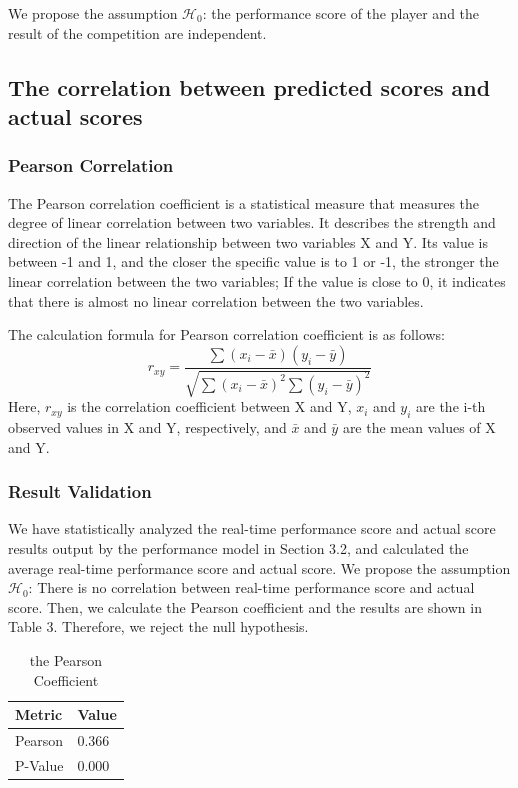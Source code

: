 \documentclass{mcmthesis}
\begin{document}
We propose the assumption $\mathcal{H}_0$: the performance score of the player and the result of the competition are independent.

\subsection{The correlation between predicted scores and actual scores}
\subsubsection{Pearson Correlation}
The Pearson correlation coefficient is a statistical measure that measures the degree of linear correlation between two variables. It describes the strength and direction of the linear relationship between two variables X and Y. Its value is between -1 and 1, and the closer the specific value is to 1 or -1, the stronger the linear correlation between the two variables; If the value is close to 0, it indicates that there is almost no linear correlation between the two variables.

The calculation formula for Pearson correlation coefficient is as follows:\[
	r_{x y}=\frac{\sum\left(x_{i}-\bar{x}\right)\left(y_{i}-\bar{y}\right)}{\sqrt{\sum\left(x_{i}-\bar{x}\right)^{2} \sum\left(y_{i}-\bar{y}\right)^{2}}}
\]
Here, $r_{x y}$ is the correlation coefficient between X and Y, $x_i$ and $y_i$ are the i-th observed values in X and Y, respectively, and $\bar{x}$ and $\bar{y}$ are the mean values of X and Y.

\subsubsection{Result Validation}
We have statistically analyzed the real-time performance score and actual score results output by the performance model in Section 3.2, and calculated the average real-time performance score and actual score. We propose the assumption $\mathcal{H}_0$: There is no correlation between real-time performance score and actual score. Then, we calculate the Pearson coefficient and the results are shown in Table 3. Therefore, we reject the null hypothesis.
\begin{table}[]
	\centering
	\begin{tabular}{ll}
		\hline
		\textbf{Metric}  & \textbf{Value} \\ \hline
		Pearson & 0.366 \\ \hline
		P-Value & 0.000 \\ \hline
	\end{tabular}
	\caption{the Pearson Coefficient}
	\label{tab:my-table}
\end{table}
\end{document}
